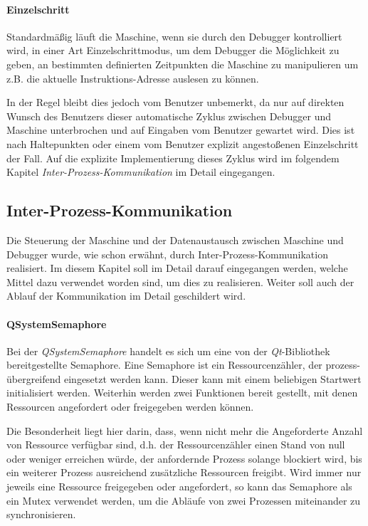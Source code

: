 \paragraph{Einzelschritt}
Standardmäßig läuft die Maschine, wenn sie durch den Debugger kontrolliert wird, in einer Art Einzelschrittmodus, um dem Debugger die Möglichkeit zu geben, an bestimmten definierten Zeitpunkten die Maschine zu manipulieren um z.B. die aktuelle Instruktions-Adresse auslesen zu können.

In der Regel bleibt dies jedoch vom Benutzer unbemerkt, da nur auf direkten Wunsch des Benutzers dieser automatische Zyklus zwischen Debugger und Maschine unterbrochen und auf Eingaben vom Benutzer gewartet wird. Dies ist nach Haltepunkten oder einem vom Benutzer explizit angestoßenen Einzelschritt der Fall. Auf die explizite Implementierung dieses Zyklus wird im folgendem Kapitel \emph{Inter-Prozess-Kommunikation} im Detail eingegangen.

\subsection{Inter-Prozess-Kommunikation}

Die Steuerung der Maschine und der Datenaustausch zwischen Maschine und Debugger wurde, wie schon erwähnt, durch Inter-Prozess-Kommunikation realisiert. Im diesem Kapitel soll im Detail darauf eingegangen werden, welche Mittel dazu verwendet worden sind, um dies zu realisieren. Weiter soll auch der Ablauf der Kommunikation im Detail geschildert wird.

\paragraph{QSystemSemaphore}
Bei der \emph{QSystemSemaphore} handelt es sich um eine von der \emph{Qt}-Bibliothek bereitgestellte Semaphore. Eine Semaphore ist ein Ressourcenzähler, der prozess-übergreifend eingesetzt werden kann. Dieser kann mit einem beliebigen Startwert initialisiert werden. Weiterhin werden zwei Funktionen bereit gestellt, mit denen Ressourcen angefordert  oder freigegeben werden können.

Die Besonderheit liegt hier darin, dass, wenn nicht mehr die Angeforderte Anzahl von Ressource verfügbar sind, d.h. der Ressourcenzähler einen Stand von null oder weniger erreichen würde, der anfordernde Prozess solange blockiert wird, bis ein weiterer Prozess ausreichend zusätzliche Ressourcen freigibt.  Wird immer nur jeweils eine Ressource freigegeben oder angefordert, so kann das Semaphore als ein Mutex verwendet werden, um die Abläufe von zwei Prozessen miteinander zu synchronisieren.

